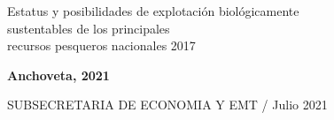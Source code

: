\documentclass[12pt, oneside]{article} %
\begin{document}
\begin{titlepage}
\begin{minipage}{\textwidth}
{            \centering \fontsize{9pt}{8pt}\selectfont
            \vspace*{-5mm} 
            \hfill \begin{flushright}
            Estatus y posibilidades de explotación biológicamente \\ sustentables de los principales \\ recursos pesqueros nacionales 2017
			\end{flushright} 
			
         	\centering \fontsize{12pt}{8pt}\selectfont
            \vspace*{-2mm} 
            \hfill \textbf{Anchoveta, 2021} 
              
			\centering \fontsize{10pt}{8pt}\selectfont
            \vspace*{2mm} 
            \hfill SUBSECRETARIA DE ECONOMIA Y EMT / Julio 2021
                        
            \vspace*{0.2cm}
        }
    \end{minipage}

\end{titlepage}
\endgroup
\end{document}
